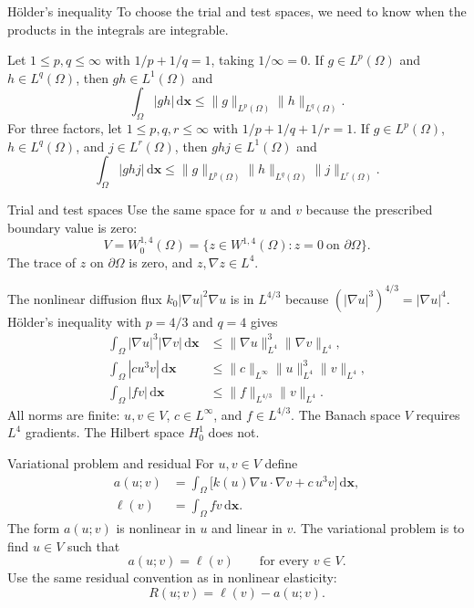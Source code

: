 \documentclass[11pt,aspectratio=169]{beamer}
\newcommand{\bx}{\bm x}
\newcommand{\dd}{\mathrm d}
\begin{document}
\begin{frame}{H\"older's inequality}
To choose the trial and test spaces, we need to know when the products
in the integrals are integrable.

\medskip
Let $1\le p,q\le\infty$ with $1/p+1/q=1$, taking $1/\infty=0$.
If $g\in L^p(\Omega)$ and $h\in L^q(\Omega)$, then $gh\in L^1(\Omega)$ and
\[
\boxed{\int_\Omega |gh|\,\dd\bx
  \le \|g\|_{L^p(\Omega)}\|h\|_{L^q(\Omega)}.}
\]
For three factors, let $1\le p,q,r\le\infty$ with $1/p+1/q+1/r=1$.
If $g\in L^p(\Omega)$, $h\in L^q(\Omega)$, and $j\in L^r(\Omega)$,
then $ghj\in L^1(\Omega)$ and
\[
\boxed{\int_\Omega |ghj|\,\dd\bx
  \le \|g\|_{L^p(\Omega)}\|h\|_{L^q(\Omega)}\|j\|_{L^r(\Omega)}.}
\]
\end{frame}

\begin{frame}{Trial and test spaces}
Use the same space for $u$ and $v$ because the prescribed boundary value is zero:
\[
V=W^{1,4}_0(\Omega)
=\{z\in W^{1,4}(\Omega):z=0\ \text{on }\partial\Omega\}.
\]
The trace of $z$ on $\partial\Omega$ is zero, and $z,\nabla z\in L^4$.

The nonlinear diffusion flux $k_0|\nabla u|^2\nabla u$ is in $L^{4/3}$
because $(|\nabla u|^3)^{4/3}=|\nabla u|^4$.
H\"older's inequality with $p=4/3$ and $q=4$ gives
\[
\begin{aligned}
\int_\Omega |\nabla u|^3|\nabla v|\,\dd\bx
  &\le \|\nabla u\|_{L^4}^3\|\nabla v\|_{L^4},\\
\int_\Omega |cu^3v|\,\dd\bx
  &\le \|c\|_{L^\infty}\|u\|_{L^4}^3\|v\|_{L^4},\\
\int_\Omega |fv|\,\dd\bx
  &\le \|f\|_{L^{4/3}}\|v\|_{L^4}.
\end{aligned}
\]
All norms are finite: $u,v\in V$, $c\in L^\infty$, and $f\in L^{4/3}$.
The Banach space $V$ requires $L^4$ gradients. The Hilbert space $H^1_0$ does not.
\end{frame}

\begin{frame}{Variational problem and residual}
For $u,v\in V$ define
\[
\begin{aligned}
a(u;v)&=\int_\Omega
 \bigl[k(u)\nabla u\cdot\nabla v+c\,u^3v\bigr]\,\dd\bx,\\
\ell(v)&=\int_\Omega fv\,\dd\bx.
\end{aligned}
\]
The form $a(u;v)$ is nonlinear in $u$ and linear in $v$.
The variational problem is to find $u\in V$ such that
\[
\boxed{a(u;v)=\ell(v)\qquad\text{for every }v\in V.}
\]
Use the same residual convention as in nonlinear elasticity:
\[
R(u;v)=\ell(v)-a(u;v).
\]
\end{frame}
\end{document}
